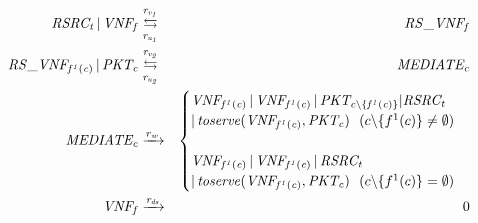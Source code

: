 \documentclass[technicalreport]{ieicej}
\begin{document}

	{\scriptsize
	  \begin{eqnarray}
	    \label{eq3}
	    \mathit{RSRC_t}\,|\,\mathit{VNF_f} &\overset{\mathit{r_{v_1}}}{\underset{\mathit{r_{u_1}}} {\leftrightarrows}}& \mathit{RS\_VNF_f}\\
	    \label{eq4}
	    \mathit{RS\_VNF_{f^1(c)}}\,|\,\mathit{PKT_c} &\overset{\mathit{r_{v_2}}}{\underset{\mathit{r_{u_2}}}{\leftrightarrows}}& \mathit{MEDIATE_c} \\ %
	     \label{eq4_1}
	    \mathit{MEDIATE_c} &\xrightarrow{r_{w}}&
	    \begin{cases}
	    \mathit{VNF_{f^1(c)}}\,|\,\mathit{VNF_{f^1(c)}}\,|\,\mathit{PKT_{c\backslash\{f^1(c)\}}}|\mathit{RSRC_t}\,\\|\,\mathit{toserve(VNF_{f^1(c)},PKT_c)} \ \ \text({c\backslash\{f^1(c)\} \neq \emptyset})\\ \\
	    \mathit{VNF_{f^1(c)}}\,|\,\mathit{VNF_{f^1(c)}}\,|\,\mathit{RSRC_t}\,\\|\,\mathit{toserve(VNF_{f^1(c)},PKT_c)} \ \ \text({c\backslash\{f^1(c)\} = \emptyset})
	    \end{cases}\\
	    \label{eq2}
	    \mathit{VNF_f} &\xrightarrow[]{\mathit{r_{ds}}}& 0
	  \end{eqnarray}
  }
\end{document}
